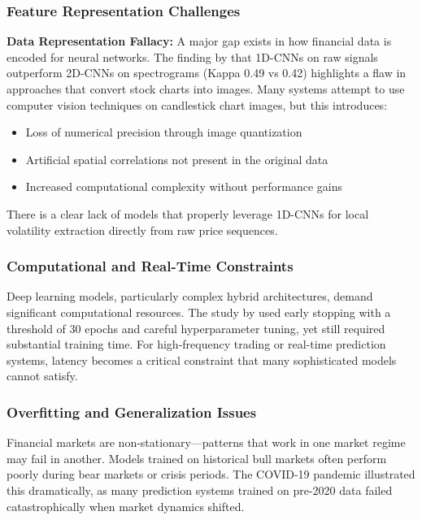 \subsubsection{Feature Representation Challenges}

\textbf{Data Representation Fallacy:}
A major gap exists in how financial data is encoded for neural networks. The finding by \cite{eda2023} that 1D-CNNs on raw signals outperform 2D-CNNs on spectrograms (Kappa 0.49 vs 0.42) highlights a flaw in approaches that convert stock charts into images. Many systems attempt to use computer vision techniques on candlestick chart images, but this introduces:
\begin{itemize}
    \item Loss of numerical precision through image quantization
    \item Artificial spatial correlations not present in the original data
    \item Increased computational complexity without performance gains
\end{itemize}

There is a clear lack of models that properly leverage 1D-CNNs for local volatility extraction directly from raw price sequences.

\subsubsection{Computational and Real-Time Constraints}

Deep learning models, particularly complex hybrid architectures, demand significant computational resources. The study by \cite{eda2023} used early stopping with a threshold of 30 epochs and careful hyperparameter tuning, yet still required substantial training time. For high-frequency trading or real-time prediction systems, latency becomes a critical constraint that many sophisticated models cannot satisfy.

\subsubsection{Overfitting and Generalization Issues}

Financial markets are non-stationary---patterns that work in one market regime may fail in another. Models trained on historical bull markets often perform poorly during bear markets or crisis periods. The COVID-19 pandemic illustrated this dramatically, as many prediction systems trained on pre-2020 data failed catastrophically when market dynamics shifted.

